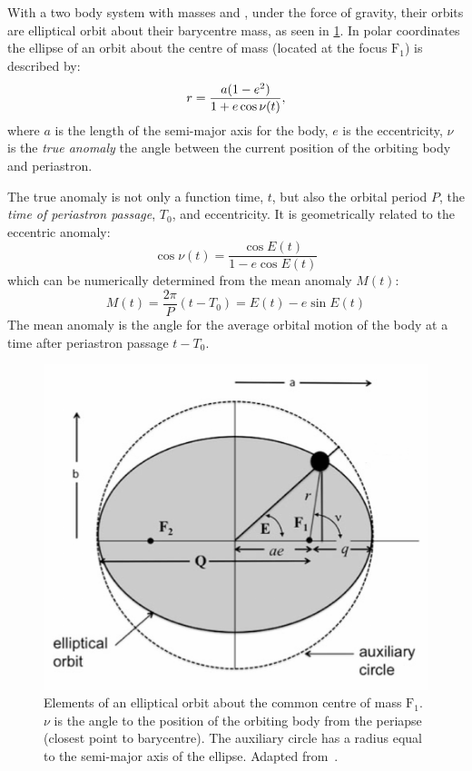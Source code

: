 With a two body system with masses \Mone{} and \Mtwo{}, under the force of gravity, their orbits are elliptical orbit about their barycentre mass, as seen in \cref{fig:eclipesorbit}.
In polar coordinates the ellipse of an orbit about the centre of mass (located at the focus $\textrm{F}_1$) is described by:
\begin{equation}
    r = \frac{a(1 - {e}^{2})}{1 + e \cos{\nu(t)}},
\end{equation}
where $a$ is the length of the semi-major axis for the body, $e$ is the eccentricity, $\nu$ is the \emph{true anomaly} the angle between the current position of the orbiting body and periastron.

The true anomaly is not only a function time, \(t\), but also the orbital period \(P\), the \emph{time of periastron passage}, \(T_0\), and eccentricity.
It is geometrically related to the eccentric anomaly:
\begin{equation}
    \cos{\nu(t)} = \frac{\cos{E(t)}}{1 - e \cos{E(t)}}
\end{equation}
which can be numerically determined from the mean anomaly \(M(t)\):
\begin{equation}
    M(t) = \frac{2 \pi}{P}(t - T_0) = E(t) - e \sin{E(t)}
\end{equation}
The mean anomaly is the angle for the average orbital motion of the body at a time after periastron passage \(t-T_0\).

\begin{figure}
    \centering
    \includegraphics[width=0.55\linewidth]{figures/fundamental_rv/eclipes_orbit2.pdf}
    \caption{Elements of an elliptical orbit about the common centre of mass \(\textrm{F}_1\). {\(\nu\)} is the angle to the position of the orbiting body from the periapse (closest point to barycentre). The auxiliary circle has a radius equal to the semi-major axis of the ellipse. Adapted from~\citep{bozza_methods_2016}.}
    \label{fig:eclipesorbit}
\end{figure}

